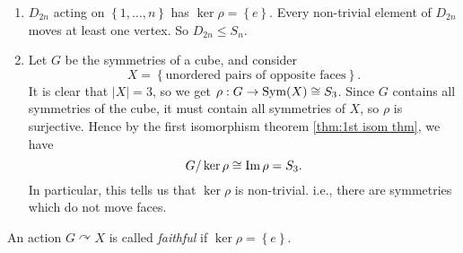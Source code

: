 \documentclass[a4paper]{article}
\begin{document}
\begin{example}
  \begin{enumerate}
    \item $ D_{2n} $ acting on $ \left\{ 1,\dots,n\right\} $ has $
      \ker \rho=\left\{ e\right\} $. Every non-trivial element of $
      D_{2n} $ moves at least one vertex. So $ D_{2n}\le S_n $.
    \item Let $G$ be the symmetries of a cube, and consider
      \[
        X=\left\{ \text{unordered pairs of opposite faces}\right\}
      .\]
      It is clear that $ |X|=3 $, so we get $ \rho:G\to \operatorname{Sym}(X) \cong
      S_3 $. Since $G$ contains all symmetries of the cube, it must
      contain all symmetries of $X$, so $\rho$ is surjective. Hence
      by the first isomorphism theorem \ref{thm:1st isom thm}, we have
      \[
        G/\ker \rho \cong \operatorname{Im} \rho = S_3
      .\]
      In particular, this tells us that $ \ker \rho $ is non-trivial.
      i.e., there are symmetries which do not move faces.
  \end{enumerate}
\end{example}
\begin{definition}
  An action $ G \curvearrowright X $ is called \textit{faithful} if $
  \ker \rho = \left\{ e\right\} $.
\end{definition}
\end{document}
